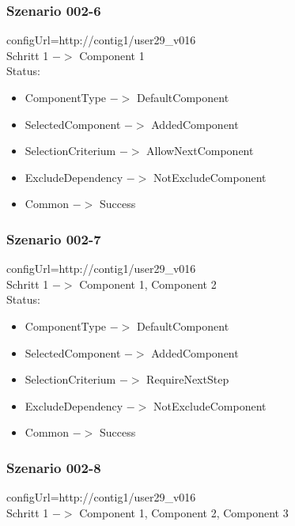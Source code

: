 \documentclass{article}
\begin{document}
\subsubsection{Szenario 002-6}

configUrl=http://contig1/user29\_v016\\

Schritt 1 $->$ Component 1\\

Status:

\begin{itemize}
  \item ComponentType $->$ DefaultComponent
  \item SelectedComponent $->$ AddedComponent
  \item SelectionCriterium $->$ AllowNextComponent
  \item ExcludeDependency $->$ NotExcludeComponent
  \item Common $->$ Success
\end{itemize}

\subsubsection{Szenario 002-7}

configUrl=http://contig1/user29\_v016\\

\noindent Schritt 1 $->$ Component 1, Component 2\\

\noindent Status:

\begin{itemize}
  \item ComponentType $->$ DefaultComponent
  \item SelectedComponent $->$ AddedComponent
  \item SelectionCriterium $->$ RequireNextStep
  \item ExcludeDependency $->$ NotExcludeComponent
  \item Common $->$ Success
\end{itemize}

\subsubsection{Szenario 002-8}

configUrl=http://contig1/user29\_v016\\

\noindent Schritt 1 $->$ Component 1, Component 2, Component 3\\
\end{document}
